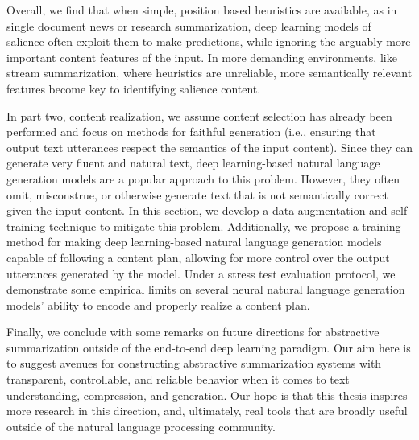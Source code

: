 \begin{titlepage}
Overall, we find that when simple, position based heuristics are available,
as in single document news or research summarization, deep learning models
of salience often exploit them to make predictions, while ignoring the
arguably more important content features of the input. In more demanding
environments, like stream summarization, where heuristics are unreliable,
more semantically relevant features become key to identifying salience 
content.

In part two, content realization, we assume content selection has already been
performed and focus on methods for faithful generation (i.e., ensuring that
output text utterances respect the semantics of the input content). Since they
can generate very fluent and natural text, deep learning-based natural language generation models are
a popular approach to this problem. However, they often omit, misconstrue, or
otherwise generate text that is not semantically correct given the input
content. In this section, we develop a data augmentation and self-training
technique to mitigate this problem. Additionally, we propose a training method
for making deep learning-based natural language generation models capable of following a content plan,
allowing for more control over the output utterances generated by the model.
Under a stress test evaluation protocol, we demonstrate some
empirical limits on several neural natural language generation models' ability to encode and properly
realize a content plan.

Finally, we conclude with some remarks on future directions for abstractive
summarization outside of the end-to-end deep learning paradigm. Our aim here
is to suggest avenues for constructing  abstractive summarization systems
with transparent, controllable, and reliable behavior when it comes to text
understanding, compression, and generation. Our hope is that this thesis inspires more research in this direction, and, ultimately, real tools that are broadly
useful outside of the natural language processing community.
 
\vspace*{\fill}
\end{titlepage}

